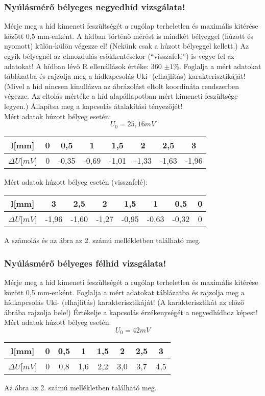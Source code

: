 \documentclass[10pt,a4paper]{article}
\begin{document}
	\subsubsection{Nyúlásmérő bélyeges negyedhíd vizsgálata!}
	Mérje meg a híd kimeneti feszültségét a rugólap terheletlen és maximális kitérése között 0,5 mm-enként. A hídban történő mérést is mindkét bélyeggel (húzott és nyomott) külön-külön végezze el! (Nekünk csak a húzott bélyeggel kellett.)
Az egyik bélyegnél az elmozdulás csökkentésekor (“visszafelé”) is vegye fel az adatokat!
A hídban lévő R ellenállások értéke: 360 $\pm 1\%$.
Foglalja a mért adatokat táblázatba és rajzolja meg a hídkapcsolás Uki-
(elhajlítás) karakterisztikáját! (Mivel a híd nincsen kinullázva az
ábrázolást eltolt koordináta rendszerben végezze. Az eltolás mértéke a híd
alapállapotban mért kimeneti feszültsége legyen.)
Állapítsa meg a kapcsolás átalakítási tényezőjét!$$$$
Mért adatok húzott bélyeg esetén:$$U_0 = 25,16 mV$$
\begin{tabular}{|c|c|c|c|c|c|c|c|}
\hline 
l[mm] & 0 & 0,5 & 1 & 1,5 & 2 & 2,5 & 3 \\ 
\hline 
$\Delta U$[$mV$] & 0 & -0,35 & -0,69 & -1,01 & -1,33 & -1,63 & -1,96 \\ 
\hline 
\end{tabular} $$$$
Mért adatok húzott bélyeg esetén (visszafelé):$$$$
\begin{tabular}{|c|c|c|c|c|c|c|c|}
\hline 
l[mm] & 3 & 2,5 & 2 & 1,5 & 1 & 0,5 & 0 \\ 
\hline 
$\Delta U$[$mV$] & -1,96 & -1,60 & -1,27 & -0,95 & -0,63 & -0,32 & 0 \\ 
\hline 
\end{tabular} $$$$
A számolás és az ábra az 2. számú mellékletben található meg.
	\subsubsection{Nyúlásmérő bélyeges félhíd vizsgálata!}
	Mérje meg a híd kimeneti feszültségét a rugólap terheletlen és maximális kitérése között 0,5 mm-enként. Foglalja a mért adatokat táblázatba és rajzolja meg a hídkapcsolás Uki- (elhajlítás) karakterisztikáját! (A karakterisztikát az előző ábrába rajzolja bele!)
Értékelje a kapcsolás érzékenységét a negyedhídhoz képest!
$$$$
Mért adatok húzott bélyeg esetén:$$U_0 = 42 mV$$
\begin{tabular}{|c|c|c|c|c|c|c|c|}
\hline 
l[mm] & 0 & 0,5 & 1 & 1,5 & 2 & 2,5 & 3 \\ 
\hline 
$\Delta U$[$mV$] & 0 & 0,8 & 1,6 & 2,2 & 3,0 & 3,7 & 4,5 \\ 
\hline 
\end{tabular} $$$$ Az ábra az 2. számú mellékletben található meg.
\end{document}
